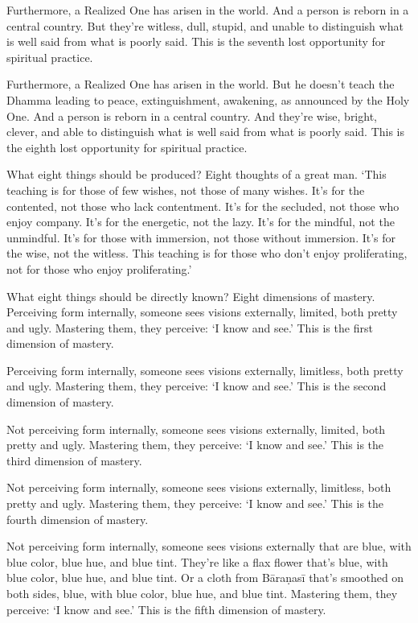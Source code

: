 \documentclass[12pt,openany]{book}%
\begin{document}
Furthermore, a Realized One has arisen in the world. And a person is reborn in a central country. But they’re witless, dull, stupid, and unable to distinguish what is well said from what is poorly said. This is the seventh lost opportunity for spiritual practice. 

Furthermore, a Realized One has arisen in the world. But he doesn’t teach the Dhamma leading to peace, extinguishment, awakening, as announced by the Holy One. And a person is reborn in a central country. And they’re wise, bright, clever, and able to distinguish what is well said from what is poorly said. This is the eighth lost opportunity for spiritual practice. 

What eight things should be produced? Eight thoughts of a great man. ‘This teaching is for those of few wishes, not those of many wishes. It’s for the contented, not those who lack contentment. It’s for the secluded, not those who enjoy company. It’s for the energetic, not the lazy. It’s for the mindful, not the unmindful. It’s for those with immersion, not those without immersion. It’s for the wise, not the witless. This teaching is for those who don’t enjoy proliferating, not for those who enjoy proliferating.’ 

What eight things should be directly known? Eight dimensions of mastery. Perceiving form internally, someone sees visions externally, limited, both pretty and ugly. Mastering them, they perceive: ‘I know and see.’ This is the first dimension of mastery. 

Perceiving form internally, someone sees visions externally, limitless, both pretty and ugly. Mastering them, they perceive: ‘I know and see.’ This is the second dimension of mastery. 

Not perceiving form internally, someone sees visions externally, limited, both pretty and ugly. Mastering them, they perceive: ‘I know and see.’ This is the third dimension of mastery. 

Not perceiving form internally, someone sees visions externally, limitless, both pretty and ugly. Mastering them, they perceive: ‘I know and see.’ This is the fourth dimension of mastery. 

Not perceiving form internally, someone sees visions externally that are blue, with blue color, blue hue, and blue tint. They’re like a flax flower that’s blue, with blue color, blue hue, and blue tint. Or a cloth from \textsanskrit{Bāraṇasī} that’s smoothed on both sides, blue, with blue color, blue hue, and blue tint. Mastering them, they perceive: ‘I know and see.’ This is the fifth dimension of mastery. 
\end{document}
